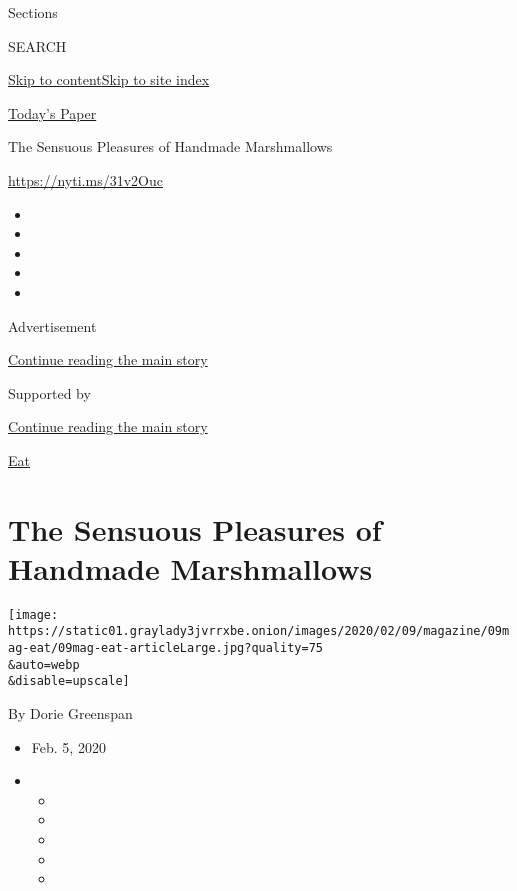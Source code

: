 Sections

SEARCH

\protect\hyperlink{site-content}{Skip to
content}\protect\hyperlink{site-index}{Skip to site index}

\href{https://myaccount.nytimes3xbfgragh.onion/auth/login?response_type=cookie\&client_id=vi}{}

\href{https://www.nytimes3xbfgragh.onion/section/todayspaper}{Today's
Paper}

The Sensuous Pleasures of Handmade Marshmallows

\url{https://nyti.ms/31v2Ouc}

\begin{itemize}
\item
\item
\item
\item
\item
\end{itemize}

Advertisement

\protect\hyperlink{after-top}{Continue reading the main story}

Supported by

\protect\hyperlink{after-sponsor}{Continue reading the main story}

\href{/column/magazine-eat}{Eat}

\hypertarget{the-sensuous-pleasures-of-handmade-marshmallows}{%
\section{The Sensuous Pleasures of Handmade
Marshmallows}\label{the-sensuous-pleasures-of-handmade-marshmallows}}

\texttt{[image: https://static01.graylady3jvrrxbe.onion/images/2020/02/09/magazine/09mag-eat/09mag-eat-articleLarge.jpg?quality=75\\\&auto=webp\\\&disable=upscale]}

By Dorie Greenspan

\begin{itemize}
\item
  Feb. 5, 2020
\item
  \begin{itemize}
  \item
  \item
  \item
  \item
  \item
  \end{itemize}
\end{itemize}

